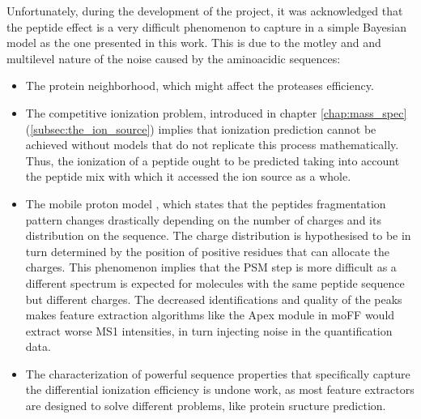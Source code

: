 Unfortunately, during the development of the project, it was acknowledged that the peptide effect is a very difficult phenomenon to capture in a simple Bayesian model as the one presented in this work. This is due to the motley and and multilevel nature of the noise caused by the aminoacidic sequences:

\begin{itemize}

\item The protein neighborhood, which might affect the protease\textquotesingle s efficiency.

\item The competitive ionization problem, introduced in chapter \ref{chap:mass_spec} (\ref{subsec:the_ion_source}) implies that ionization prediction cannot be achieved without models that do not replicate this process mathematically. Thus, the ionization of a peptide ought to be predicted taking into account the peptide mix with which it accessed the ion source as a whole.


\item The mobile proton model \cite{Boyd2010}, which states that the peptide\textquotesingle s fragmentation pattern changes drastically depending on the number of charges and its distribution on the sequence. The charge distribution is hypothesised to be in turn determined by the position of positive residues that can allocate the charges. This phenomenon implies that the \ac{PSM} step is more difficult as a different spectrum is expected for molecules with the same peptide sequence but different charges. The decreased identifications and quality of the peaks makes feature extraction algorithms like the Apex module in moFF would extract worse \ac{MS1} intensities, in turn injecting noise in the quantification data.

\item The characterization of powerful sequence properties that specifically capture the differential ionization efficiency is undone work, as most feature extractors are designed to solve different problems, like protein sructure prediction.

\end{itemize}

